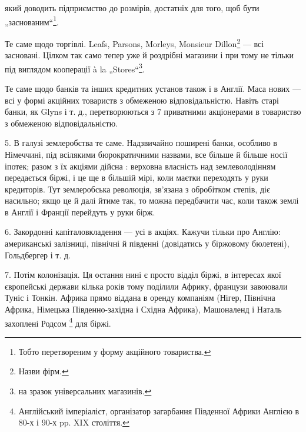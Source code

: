 \parcont{}  %
який доводить підприємство до розмірів, достатніх для того, щоб бути „заснованим“\footnote*{Тобто перетвореним у форму акційного товариства. }.

Те саме щодо торгівлі. Leafs, Parsons, Morleys, Monsieur Dillon\footnote*{Назви фірм. } — всі засновані. Цілком так само тепер уже й роздрібні
магазини і при тому не тільки під виглядом кооперації à la „Stores“\footnote*{на зразок універсальних магазинів. }.

Те саме щодо банків та інших кредитних установ також і в Англії. Маса нових — всі у формі акційних товариств з обмеженою
відповідальністю. Навіть старі банки, як Glyns і т. д., перетворюються з 7 приватними акціонерами в товариство з обмеженою відповідальністю.

5. В галузі землеробства те саме. Надзвичайно поширені банки, особливо в Німеччині, під всілякими
бюрократичними назвами, все більше й більше носії іпотек; разом з їх акціями дійсна :  верховна власність над
землеволодінням передається біржі, і це
ще в більшій мірі, коли маєтки переходять у руки кредиторів. Тут землеробська революція, зв’язана з обробітком степів, діє
насильно; якщо це й далі йтиме так, то можна передбачити час, коли також землі в Англії і Франції перейдуть у руки бірж.

6. Закордонні капіталовкладення — усі в акціях. Кажучи тільки про Англію: американські залізниці, північні й південні
(довідатись у біржовому бюлетені), Гольдбергер і т. д.

7. Потім колонізація. Ця остання нині є просто відділ біржі, в інтересах
якої європейські держави кілька років тому поділили Африку, французи завоювали Туніс і Тонкін. Африка прямо віддана в
оренду компаніям (Нігер, Північна Африка, Німецька Південно-західна і Східна Африка), Машоналенд і Наталь захоплені Родсом
\footnote*{Англійський імперіаліст, організатор загарбання Південної Африки Англією в 80-х і 90-х pp. XIX століття.
} для біржі.
